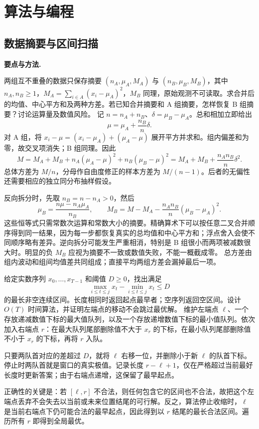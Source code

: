 \chapter{算法与编程}
\section{数据摘要与区间扫描}
\noindent\textbf{要点与方法.}\enspace


两组互不重叠的数据只保存摘要 $(n_A,\mu_A,M_A)$ 与 $(n_B,\mu_B,M_B)$，其中 $n_A,n_B\ge1$，$M_A=\sum_{i\in A}(x_i-\mu_A)^2$，$M_B$ 同理，原始观测不可读取。求合并后的均值、中心平方和及两种方差。若已知合并摘要和 A 组摘要，怎样恢复 B 组摘要？讨论运算量及数值风险。
\solution 记 $n=n_A+n_B$、$\delta=\mu_B-\mu_A$。总和相加立即给出
\[
\mu=\mu_A+\frac{n_B}{n}\delta.
\]
对 A 组，将 $x_i-\mu=(x_i-\mu_A)+(\mu_A-\mu)$ 展开平方并求和。组内偏差和为零，故交叉项消失；B 组同理。因此
\[
M=M_A+M_B+n_A(\mu_A-\mu)^2+n_B(\mu_B-\mu)^2
 =M_A+M_B+\frac{n_An_B}{n}\delta^2.
\]
总体方差为 $M/n$，分母作自由度修正的样本方差为 $M/(n-1)$。后者的无偏性还需要相应的独立同分布抽样假设。

反向拆分时，先取 $n_B=n-n_A>0$，然后
\[
\mu_B=\frac{n\mu-n_A\mu_A}{n_B},\qquad
M_B=M-M_A-\frac{n_An_B}{n}(\mu_B-\mu_A)^2.
\]
这些恒等式只需常数次运算和常数大小的摘要。精确算术下可以按任意二叉合并顺序得到同一结果，因为每一步都恢复真实的总均值和中心平方和；浮点舍入会使不同顺序略有差异。逆向拆分可能发生严重相消，特别是 B 组很小而两项被减数很大时。明显的负 $M_B$ 应视为摘要不一致或数值失败，不能一概截成零。
\insight 总方差由组内波动和组间均值差共同组成；直接平均两组方差会漏掉最后一项。

给定实数序列 $x_0,\ldots,x_{T-1}$ 和阈值 $D\ge0$，找出满足
\[
\max_{i\le t\le j}x_t-\min_{i\le t\le j}x_t\le D
\]
的最长非空连续区间。长度相同时返回起点最早者；空序列返回空区间。设计 $O(T)$ 时间算法，并证明左端点的移动不会跳过最优解。
\solution 维护左端点 $\ell$、一个存放递减数值下标的最大值队列，以及一个存放递增数值下标的最小值队列。依次加入右端点 $r$：在最大队列尾部删除值不大于 $x_r$ 的下标，在最小队列尾部删除值不小于 $x_r$ 的下标，再将 $r$ 入队。

只要两队首对应的差超过 $D$，就将 $\ell$ 右移一位，并删除小于新 $\ell$ 的队首下标。停止时两队首就是窗口的真实极值。记录长度 $r-\ell+1$，仅在严格超过当前最好长度时更新答案；由于右端点递增，这保留了最早起点。

正确性的关键是：若 $[\ell,r]$ 不合法，则任何包含它的区间也不合法，故把这个左端点丢弃不会失去以当前或未来位置结尾的可行解。反之，算法停止收缩时，$\ell$ 是当前右端点下仍可能合法的最早起点，因此得到以 $r$ 结尾的最长合法区间。遍历所有 $r$ 即得到全局最优。

